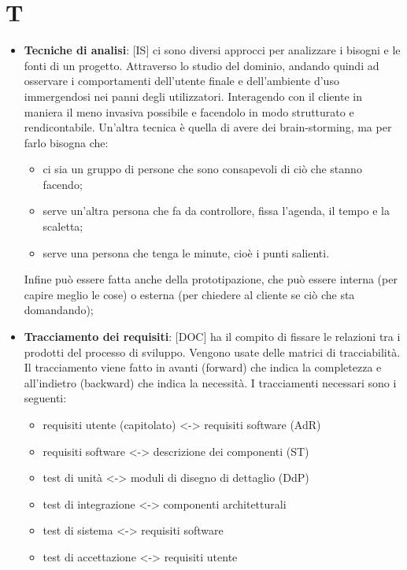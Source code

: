%
%
%

\section{T} %
\label{sec:t}
	\begin{itemize}
		\item \textbf{Tecniche di analisi}: [IS] ci sono diversi approcci per analizzare i bisogni e le fonti di un progetto. Attraverso lo studio del dominio, andando quindi ad osservare i comportamenti dell'utente finale e dell'ambiente d'uso immergendosi nei panni degli utilizzatori. Interagendo con il cliente in maniera il meno invasiva possibile e facendolo in modo strutturato e rendicontabile. Un'altra tecnica è quella di avere dei brain-storming, ma per farlo bisogna che:
			\begin{itemize}
				\item ci sia un gruppo di persone che sono consapevoli di ciò che stanno facendo;
				\item serve un'altra persona che fa da controllore, fissa l'agenda, il tempo e la scaletta;
				\item serve una persona che tenga le minute, cioè i punti salienti.
			\end{itemize}
		\noindent
		Infine può essere fatta anche della prototipazione, che può essere interna (per capire meglio le cose) o esterna (per chiedere al cliente se ciò che sta domandando);

		\item \textbf{Tracciamento dei requisiti}: [DOC] ha il compito di fissare le relazioni tra i prodotti del processo di sviluppo. Vengono usate delle matrici di tracciabilità. Il tracciamento viene fatto in avanti (forward) che indica la completezza e all'indietro (backward) che indica la necessità. I tracciamenti necessari sono i seguenti:
			\begin{itemize}
				\item requisiti utente (capitolato) <-> requisiti software (AdR)
				\item requisiti software <-> descrizione dei componenti (ST)
				\item test di unità <-> moduli di disegno di dettaglio (DdP)
				\item test di integrazione <-> componenti architetturali
				\item test di sistema <-> requisiti software
				\item test di accettazione <-> requisiti utente
			\end{itemize}

	\end{itemize}
